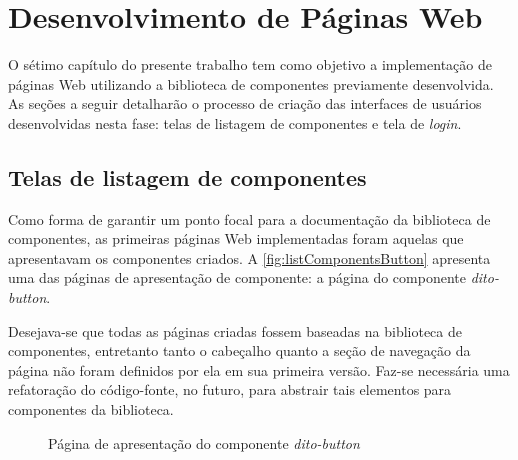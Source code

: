 
\chapter{Desenvolvimento de Páginas Web}
\label{chap:devWeb}

O sétimo capítulo do presente trabalho tem como objetivo a implementação de páginas Web utilizando a biblioteca de componentes previamente desenvolvida. As seções a seguir detalharão o processo de criação das interfaces de usuários desenvolvidas nesta fase: telas de listagem de componentes e tela de \textit{login}.

\section{Telas de listagem de componentes}
\label{sec:listaComponentes}

Como forma de garantir um ponto focal para a documentação da biblioteca de componentes, as primeiras páginas Web implementadas foram aquelas que apresentavam os componentes criados. A \autoref{fig:listComponentsButton} apresenta uma das páginas de apresentação de componente: a página do componente \textit{dito-button}.

Desejava-se que todas as páginas criadas fossem baseadas na biblioteca de componentes, entretanto tanto o cabeçalho quanto a seção de navegação da página não foram definidos por ela em sua primeira versão. Faz-se necessária uma refatoração do código-fonte, no futuro, para abstrair tais elementos para componentes da biblioteca.

\begin{figure}
  \begin{center}
	\end{center}
  \caption{Página de apresentação do componente \textit{dito-button}}
  \label{fig:listComponentsButton}
\end{figure}

